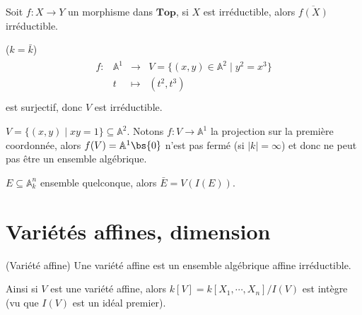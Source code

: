         \begin{exo}
            Soit $f : X \to Y$ un morphisme dans $\mathbf{Top}$, si $X$ est irréductible, alors $\overline{f(X)}$ irréductible.
        \end{exo}
        \begin{expl}
            ($k = \bar k$) 
            \begin{align*}
                \begin{array}{cccc}
                    f : & \mathbb{A}^1 & \to & V = \{(x,y) \in \mathbb{A}^2 \mid y^2 = x^3\} \\
                    & t & \mapsto & (t^2, t^3) \\
                \end{array}
            \end{align*}
            est surjectif, donc $V$ est irréductible.
        \end{expl}
        \begin{expl}
            $V = \{(x,y) \mid xy = 1\} \subseteq \mathbb{A}^2$. Notons $f : V \to \mathbb{A}^1$ la projection sur la première coordonnée, alors $f(V) = \mathbb{A}^1 \bs \{0\}$ n'est pas fermé (si $|k| = \infty$) et donc ne peut pas être un ensemble algébrique.
        \end{expl}
        \begin{exo}
            $E \subseteq \mathbb{A}^n_k$ ensemble quelconque, alors $\bar E = V(I(E))$. 
        \end{exo}

    \section{Variétés affines, dimension}
        \begin{defi} (Variété affine)
            Une variété affine est un ensemble algébrique affine irréductible.
        \end{defi}
        Ainsi si $V$ est une variété affine, alors $k[V] = k[X_1, \cdots, X_n]/I(V)$ est intègre (vu que $I(V)$ est un idéal premier).
